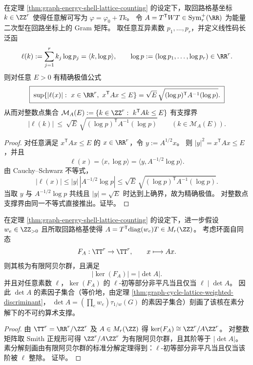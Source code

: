 \begin{proposition}\label{prop:graph-energy-ellipsoid-godel-codelength-dual}
在定理 \ref{thm:graph-energy-shell-lattice-counting} 的设定下，取回路格基坐标 \(k\in\ZZ^r\) 使得任意解可写为 \(\varphi=\varphi_0+Tk\)。
令 \(A=T^{\mathsf T}WT\in\mathrm{Sym}_r^+(\RR)\) 为能量二次型在回路坐标上的 Gram 矩阵。
取任意互异素数 \(p_1,\dots,p_r\)，并定义线性码长泛函
\[
\ell(k):=\sum_{j=1}^r k_j\log p_j=\langle k,\log p\rangle,
\qquad
\log p:=(\log p_1,\dots,\log p_r)\in\RR^r.
\]
则对任意 \(E>0\) 有精确极值公式
\[
\boxed{\;
\sup\{|\ell(x)|:\ x\in\RR^r,\ x^{\mathsf T}Ax\le E\}
=\sqrt E\,\sqrt{(\log p)^{\mathsf T}A^{-1}(\log p)}.
\;}
\]
从而对整数点集合
\(
\mathcal M_A(E):=\{k\in\ZZ^r:\ k^{\mathsf T}Ak\le E\}
\)
有支撑界
\[
|\ell(k)|\ \le\ \sqrt E\,\sqrt{(\log p)^{\mathsf T}A^{-1}(\log p)}
\qquad (k\in\mathcal M_A(E)).
\]
\end{proposition}
\begin{proof}
对任意满足 \(x^{\mathsf T}Ax\le E\) 的 \(x\in\RR^r\)，令 \(y:=A^{1/2}x\)。
则 \(|y|^2=x^{\mathsf T}Ax\le E\)，并且
\[
\ell(x)=\langle x,\log p\rangle=\langle y, A^{-1/2}\log p\rangle.
\]
由 Cauchy--Schwarz 不等式，
\[
|\ell(x)|
\le
|y|\,|A^{-1/2}\log p|
\le
\sqrt E\,\sqrt{(\log p)^{\mathsf T}A^{-1}(\log p)}.
\]
当取 \(y\) 与 \(A^{-1/2}\log p\) 共线且 \(|y|=\sqrt E\) 时达到上确界，故为精确极值。
对整数点支撑界由同一不等式直接推出。证毕。
\end{proof}

\begin{corollary}[行列式素支撑与核结构的不可约算术障碍]\label{cor:graph-cycle-lattice-determinant-prime-support}
在定理 \ref{thm:graph-energy-shell-lattice-counting} 的设定下，进一步假设 \(w_e\in\ZZ_{>0}\) 且所取回路格基使得 \(A=T^{\mathsf T}\mathrm{diag}(w_e)T\in M_r(\ZZ)\)。
考虑环面自同态
\[
F_A:\TT^r\to\TT^r,\qquad x\longmapsto Ax.
\]
则其核为有限阿贝尔群，且满足
\[
|\ker(F_A)|=|\det A|.
\]
并且对任意素数 \(\ell\)，\(\ker(F_A)\) 的 \(\ell\)-初等部分非平凡当且仅当 \(\ell\mid \det A\)。
因此 \(\det A\) 的素因子集合（等价地，由定理 \ref{thm:graph-cycle-lattice-weighted-discriminant}，
\(\det A=(\prod_e w_e)\tau_{1/w}(G)\) 的素因子集合）刻画了该核在素分解下的不可约算术支撑。
\end{corollary}
\begin{proof}
由 \(\TT^r=\RR^r/\ZZ^r\) 及 \(A\in M_r(\ZZ)\) 得 \(\ker(F_A)\cong \ZZ^r/A\ZZ^r\)。
对整数矩阵取 Smith 正规形可得 \(\ZZ^r/A\ZZ^r\) 为有限阿贝尔群，且其阶等于 \(|\det A|\)。
素分解刻画由有限阿贝尔群的标准分解定理得到：\(\ell\)-初等部分非平凡当且仅当该阶被 \(\ell\) 整除。
证毕。
\end{proof}

